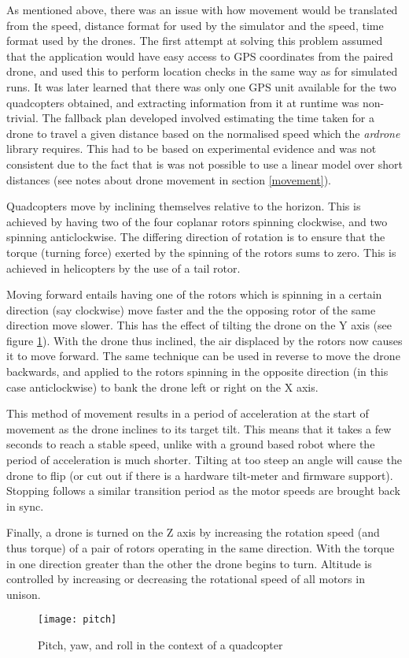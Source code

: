 As mentioned above, there was an issue with how movement would be translated from the {speed, distance} format for used by the simulator and the {speed, time} format used by the drones. The first attempt at solving this problem assumed that the application would have easy access to GPS coordinates from the paired drone, and used this to perform location checks in the same way as for simulated runs. It was later learned that there was only one GPS unit available for the two quadcopters obtained, and extracting information from it at runtime was non-trivial. The fallback plan developed involved estimating the time taken for a drone to travel a given distance based on the normalised speed which the \textit{ardrone} library requires. This had to be based on experimental evidence and was not consistent due to the fact that is was not possible to use a linear model over short distances (see notes about drone movement in section \ref{movement}).

\begin{aside}
\label{movement}
Quadcopters move by inclining themselves relative to the horizon. This is achieved by having two of the four coplanar rotors spinning clockwise, and two spinning anticlockwise. The differing direction of rotation is to ensure that the torque (turning force) exerted by the spinning of the rotors sums to zero. This is achieved in helicopters by the use of a tail rotor.

Moving forward entails having one of the rotors which is spinning in a certain direction (say clockwise) move faster and the the opposing rotor of the same direction move slower. This has the effect of tilting the drone on the Y axis (see figure \ref{pitch}). With the drone thus inclined, the air displaced by the rotors now causes it to move forward. The same technique can be used in reverse to move the drone backwards, and applied to the rotors spinning in the opposite direction (in this case anticlockwise) to bank the drone left or right on the X axis.

This method of movement results in a period of acceleration at the start of movement as the drone inclines to its target tilt. This means that it takes a few seconds to reach a stable speed, unlike with a ground based robot where the period of acceleration is much shorter. Tilting at too steep an angle will cause the drone to flip (or cut out if there is a hardware tilt-meter and firmware support). Stopping follows a similar transition period as the motor speeds are brought back in sync.

Finally, a drone is turned on the Z axis by increasing the rotation speed (and thus torque) of a pair of rotors operating in the same direction. With the torque in one direction greater than the other the drone begins to turn. Altitude is controlled by increasing or decreasing the rotational speed of all motors in unison.

\begin{figure}[H]
\centering
\texttt{[image: pitch]}
\caption{Pitch, yaw, and roll in the context of a quadcopter\cite{Hansen2014}}
\label{pitch}
\end{figure}
\end{aside}

